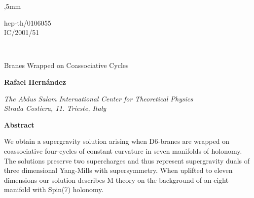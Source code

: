 \documentclass[12pt,a4paper]{article}
\begin{document}
,5mm


\def\II{\relax{\rm 1\kern-.35em1}}
\def\IP{\relax{\rm I\kern-.18em P}}
\def\muh{\hat \mu}
\def\nuh{\hat \nu}
\def\rhoh{\hat \rho}
\def\lambdah{\hat \lambda}
\def\sigmah{\hat \sigma}
\def\tauh{\hat \tau}

\begin{flushright}
hep-th/0106055 \\
IC/2001/51
\end{flushright}

\begin{center}

{}~\vfill

{ {\LARGE {Branes Wrapped on Coassociative Cycles}}}

\vspace{20 mm}


{\bf{\large{Rafael Hern\'{a}ndez}}}\myHighlight{$^{\dag}$}\coordHE{}

\vspace{8 mm}

{\em The Abdus Salam International Center for Theoretical Physics \\
Strada Costiera, 11. \coordHE{} Trieste, Italy}
\vspace{16 mm}

\end{center}



\begin{center}
{\bf Abstract}
\end{center}
  
\vspace{2 mm}
  
We obtain a supergravity solution arising when D6-branes are wrapped on 
coassociative four-cycles of constant curvature in seven manifolds of \coordHE{} holonomy. 
The solutions preserve two supercharges and thus represent supergravity duals of 
three dimensional Yang-Mills with \coordHE{} supersymmetry. When uplifted to eleven 
dimensions our solution describes M-theory on the background of an eight manifold 
with Spin(7) holonomy.

\vspace{42 mm}

{\footnotesize \dag}


\newpage


\end{document}
